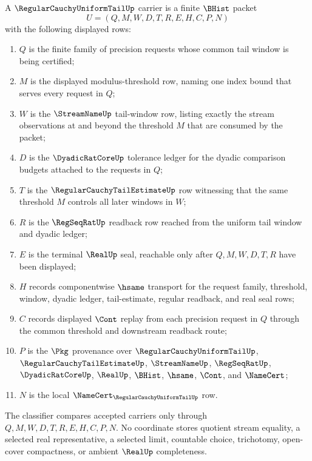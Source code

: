 \begin{definition}
\label{def:regular-cauchy-uniform-tail-carrier}
A $\RegularCauchyUniformTailUp$ carrier is a finite $\BHist$ packet
$$
U=(Q,M,W,D,T,R,E,H,C,P,N)
$$
with the following displayed rows:
\begin{enumerate}
\item $Q$ is the finite family of precision requests whose common tail window is being certified;
\item $M$ is the displayed modulus-threshold row, naming one index bound that serves every request in $Q$;
\item $W$ is the $\StreamNameUp$ tail-window row, listing exactly the stream observations at and beyond the threshold $M$ that are consumed by the packet;
\item $D$ is the $\DyadicRatCoreUp$ tolerance ledger for the dyadic comparison budgets attached to the requests in $Q$;
\item $T$ is the $\RegularCauchyTailEstimateUp$ row witnessing that the same threshold $M$ controls all later windows in $W$;
\item $R$ is the $\RegSeqRatUp$ readback row reached from the uniform tail window and dyadic ledger;
\item $E$ is the terminal $\RealUp$ seal, reachable only after $Q,M,W,D,T,R$ have been displayed;
\item $H$ records componentwise $\hsame$ transport for the request family, threshold, window, dyadic ledger, tail-estimate, regular readback, and real seal rows;
\item $C$ records displayed $\Cont$ replay from each precision request in $Q$ through the common threshold and downstream readback route;
\item $P$ is the $\Pkg$ provenance over $\RegularCauchyUniformTailUp$, $\RegularCauchyTailEstimateUp$, $\StreamNameUp$, $\RegSeqRatUp$, $\DyadicRatCoreUp$, $\RealUp$, $\BHist$, $\hsame$, $\Cont$, and $\NameCert$;
\item $N$ is the local $\NameCert_{\RegularCauchyUniformTailUp}$ row.
\end{enumerate}
The classifier compares accepted carriers only through $Q,M,W,D,T,R,E,H,C,P,N$. No coordinate stores quotient stream equality, a selected real representative, a selected limit, countable choice, trichotomy, open-cover compactness, or ambient $\RealUp$ completeness.
\end{definition}

